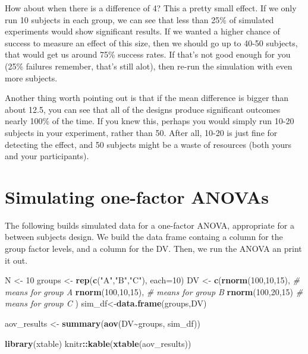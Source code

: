 \documentclass[
]{book}
\newenvironment{Shaded}{\begin{snugshade}}{\end{snugshade}}
\newcommand{\AttributeTok}[1]{\textcolor[rgb]{0.13,0.29,0.53}{#1}}
\newcommand{\CommentTok}[1]{\textcolor[rgb]{0.56,0.35,0.01}{\textit{#1}}}
\newcommand{\DecValTok}[1]{\textcolor[rgb]{0.00,0.00,0.81}{#1}}
\newcommand{\FunctionTok}[1]{\textcolor[rgb]{0.13,0.29,0.53}{\textbf{#1}}}
\newcommand{\NormalTok}[1]{#1}
\newcommand{\OtherTok}[1]{\textcolor[rgb]{0.56,0.35,0.01}{#1}}
\newcommand{\SpecialCharTok}[1]{\textcolor[rgb]{0.81,0.36,0.00}{\textbf{#1}}}
\newcommand{\StringTok}[1]{\textcolor[rgb]{0.31,0.60,0.02}{#1}}
\begin{document}
How about when there is a difference of 4? This a pretty small effect. If we only run 10 subjects in each group, we can see that less than 25\% of simulated experiments would show significant results. If we wanted a higher chance of success to measure an effect of this size, then we should go up to 40-50 subjects, that would get us around 75\% success rates. If that's not good enough for you (25\% failures remember, that's still alot), then re-run the simulation with even more subjects.

Another thing worth pointing out is that if the mean difference is bigger than about 12.5, you can see that all of the designs produce significant outcomes nearly 100\% of the time. If you knew this, perhaps you would simply run 10-20 subjects in your experiment, rather than 50. After all, 10-20 is just fine for detecting the effect, and 50 subjects might be a waste of resources (both yours and your participants).

\section{Simulating one-factor ANOVAs}\label{simulating-one-factor-anovas}

The following builds simulated data for a one-factor ANOVA, appropriate for a between subjects design. We build the data frame containg a column for the group factor levels, and a column for the DV. Then, we run the ANOVA an print it out.

\begin{Shaded}
\begin{Highlighting}[]
\NormalTok{N }\OtherTok{\textless{}{-}} \DecValTok{10}
\NormalTok{groups }\OtherTok{\textless{}{-}} \FunctionTok{rep}\NormalTok{(}\FunctionTok{c}\NormalTok{(}\StringTok{"A"}\NormalTok{,}\StringTok{"B"}\NormalTok{,}\StringTok{"C"}\NormalTok{), }\AttributeTok{each=}\DecValTok{10}\NormalTok{)}
\NormalTok{DV }\OtherTok{\textless{}{-}} \FunctionTok{c}\NormalTok{(}\FunctionTok{rnorm}\NormalTok{(}\DecValTok{100}\NormalTok{,}\DecValTok{10}\NormalTok{,}\DecValTok{15}\NormalTok{),   }\CommentTok{\# means for group A}
        \FunctionTok{rnorm}\NormalTok{(}\DecValTok{100}\NormalTok{,}\DecValTok{10}\NormalTok{,}\DecValTok{15}\NormalTok{),   }\CommentTok{\# means for group B}
        \FunctionTok{rnorm}\NormalTok{(}\DecValTok{100}\NormalTok{,}\DecValTok{20}\NormalTok{,}\DecValTok{15}\NormalTok{)    }\CommentTok{\# means for group C}
\NormalTok{        )}
\NormalTok{sim\_df}\OtherTok{\textless{}{-}}\FunctionTok{data.frame}\NormalTok{(groups,DV)}

\NormalTok{aov\_results }\OtherTok{\textless{}{-}} \FunctionTok{summary}\NormalTok{(}\FunctionTok{aov}\NormalTok{(DV}\SpecialCharTok{\textasciitilde{}}\NormalTok{groups, sim\_df))}

\FunctionTok{library}\NormalTok{(xtable)}
\NormalTok{knitr}\SpecialCharTok{::}\FunctionTok{kable}\NormalTok{(}\FunctionTok{xtable}\NormalTok{(aov\_results))}
\end{Highlighting}
\end{Shaded}
\end{document}
